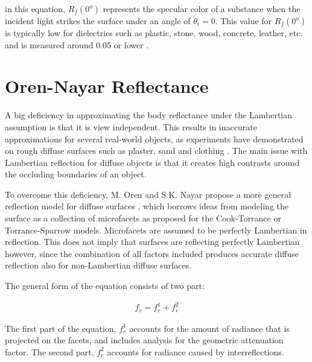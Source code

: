 \noindent in this equation, $R_f(0^o)$ represents the specular color of a substance when the incident light strikes the surface under an angle of $\theta_i = 0$. This value for $R_f(0^o)$ is typically low for dielectrics such as plastic, stone, wood, concrete, leather, etc. and is measured around 0.05 or lower \cite{RTR}. 


\section{Oren-Nayar Reflectance}\label{sec:OrenNayar}
A big deficiency in approximating the body reflectance under the Lambertian assumption is that it is view independent. This results in inaccurate approximations for several real-world objects, as experiments have demonstrated on rough diffuse surfaces such as plaster, sand and clothing \cite{OrenNayar}. The main issue with Lambertian reflection for diffuse objects is that it creates high contrasts around the occluding boundaries of an object.

To overcome this deficiency, M. Oren and S.K. Nayar propose a more general reflection model for diffuse surfaces \cite{OrenNayar} \cite{ImprovedDiffuse}, which borrows ideas from modeling the surface as a collection of microfacets as proposed for the Cook-Torrance or Torrance-Sparrow models. Microfacets are assumed to be perfectly Lambertian in reflection. This does not imply that surfaces are reflecting perfectly Lambertian however, since the combination of all factors included produces accurate diffuse reflection also for non-Lambertian diffuse surfaces. 

The general form of the equation consists of two part:

	\begin{eqnarray*}
		f_r = f_r^1 + f_r^2
	\end{eqnarray*}

\noindent The first part of the equation, $f_r^1$ accounts for the amount of radiance that is projected on the facets, and includes analysis for the geometric attenuation factor. The second part, $f_r^2$ accounts for radiance caused by interreflections.


